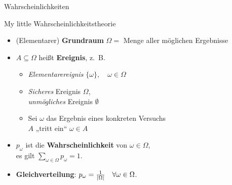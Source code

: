 



\morescalingdelimiters


	
	
\begin{headframe}
	Wahrscheinlichkeiten
\end{headframe}
	

\begin{frame}{My little Wahrscheinlichkeitstheorie}
	\begin{itemize}
		\item (Elementarer) \textbf{Grundraum} $\Omega =$ Menge aller möglichen Ergebnisse
		\item $A \subseteq \Omega$ heißt \textbf{Ereignis}, z.~B.
		\begin{itemize}
			\item \textit{Elementarereignis} $\{\omega\}, \quad  \omega \in \Omega$
			\item \textit{Sicheres} Ereignis $\Omega$, \\ \textit{unmögliches} Ereignis $\emptyset$
			\item Sei $\omega$ das Ergebnis eines konkreten Versuchs \\ 
			\Impl $A$ „tritt ein“ \gdw $\omega \in A$
		\end{itemize}
		\item $p_\omega$ ist die \textbf{Wahrscheinlichkeit} von $\omega \in \Omega$, \\ es gilt $\sum\limits_{\omega \in \Omega} p_\omega = 1$.
		\item \textbf{Gleichverteilung}: $p_\omega = \frac{1}{\left| \Omega \right|} \quad \forall \omega \in \Omega$.	
	\end{itemize}
\end{frame}

